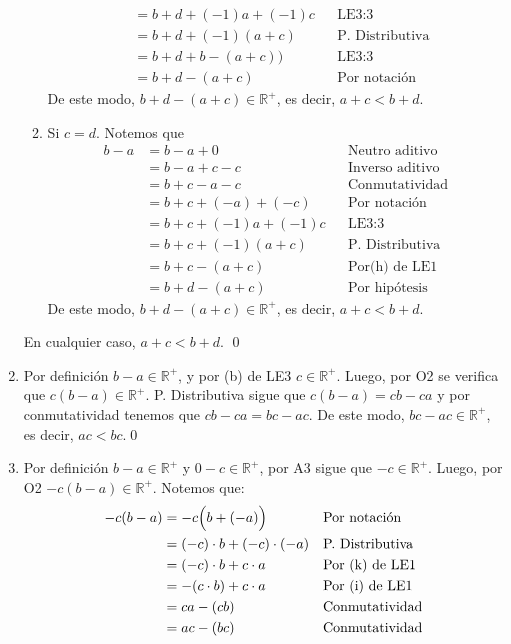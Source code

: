 \documentclass[11pt]{article}
\newcommand{\R}{\mathbb{R}}
\begin{document}
\begin{enumerate}[label=\alph*)]
\begin{enumerate}[label=\roman*)]
\begin{align*}
        &= b+d+(-1)a+(-1)c && \text{LE3:3}\\
        &= b+d+ (-1) (a + c) && \text{P. Distributiva}\\
        &= b+d + b-(a+c) \big) && \text{LE3:3}\\
        &= b+d - (a+c) && \text{Por notación}
        \end{align*}
    De este modo, $b+d-(a+c)\in \R^+$, es decir, $a+c<b+d$.
    \item Si $c=d$. Notemos que
        \begin{align*}
        b - a &= b -a + 0 && \text{Neutro aditivo}\\
        &= b-a+c-c && \text{Inverso aditivo}\\
        &= b+c-a-c && \text{Conmutatividad}\\
        &= b+c+(-a)+(-c) && \text{Por notación}\\
        &= b+c+(-1)a+(-1)c && \text{LE3:3}\\
        &= b+c+(-1)(a+c) && \text{P. Distributiva}\\
        &= b+c-(a+c) && \text{Por(h) de LE1}\\
        &= b+d-(a+c) && \text{Por hipótesis}
        \end{align*}
    De este modo, $b+d-(a+c)\in \R^+$, es decir, $a+c<b+d$.
    \end{enumerate}
    En cualquier caso, $a+c<b+d$. \qed
\item Por definición $b-a \in \R^+$, y por (b) de LE3 $c \in \R^+$. Luego, por O2 se verifica que $c(b-a) \in \R^+$. P. Distributiva sigue que $c(b-a)=cb-ca$ y por conmutatividad tenemos que $cb-ca=bc-ac$. De este modo, $bc-ac \in \R^+$, es decir, $ac<bc$.\qed
\pagebreak
\item Por definición $b-a \in \R^+$ y $0 - c \in \R^+$, por A3 sigue que $ -c \in \R^+$. Luego, por O2 $-c(b-a) \in \R^+$. Notemos que:
    \begin{align*}
    -c(b-a) &= -c \Bigl( b + (-a) \Bigr) && \text{Por notación}\\
    &= (-c) \cdot b + (-c) \cdot (-a) && \text{P. Distributiva}\\
    &= (-c) \cdot b + c \cdot a && \text{Por (k) de LE1}\\
    &= -(c \cdot b) + c \cdot a && \text{Por (i) de LE1}\\
    &= ca -(cb) && \text{Conmutatividad}\\
    &= ac - (bc) && \text{Conmutatividad}
    \end{align*}

\end{enumerate}
\end{document}
